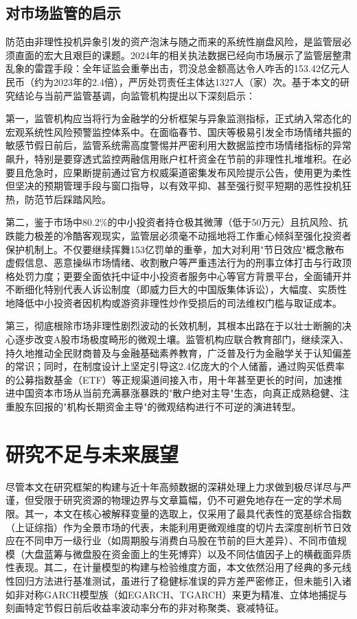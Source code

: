 \documentclass{cupb-thesis}
\begin{document}
{\section{对市场监管的启示}


防范由非理性投机异象引发的资产泡沫与随之而来的系统性崩盘风险，是监管层必须直面的宏大且艰巨的课题。2024年的相关执法数据已经向市场展示了监管层整肃乱象的雷霆手段：全年证监会重拳出击，罚没总金额高达令人咋舌的153.42亿元人民币（约为2023年的2.4倍），严厉处罚责任主体达1327人（家）次。基于本文的研究结论与当前严监管基调，向监管机构提出以下深刻启示：


第一，监管机构应当将行为金融学的分析框架与异象监测指标，正式纳入常态化的宏观系统性风险预警监控体系中。在面临春节、国庆等极易引发全市场情绪共振的敏感节假日前后，监管系统需高度警惕并严密利用大数据监控市场情绪指标的异常飙升，特别是要穿透式监控两融信用账户杠杆资金在节前的非理性扎堆堆积。在必要且危急时，应果断提前通过官方权威渠道密集发布风险提示公告，使用更为柔性但坚决的预期管理手段与窗口指导，以有效平抑、甚至强行熨平短期的恶性投机狂热，防范节后踩踏风险。

第二，鉴于市场中80.2\%的中小投资者持仓极其微薄（低于50万元）且抗风险、抗跌能力极差的冷酷客观现实，监管层必须毫不动摇地将工作重心倾斜至强化投资者保护机制上。不仅要继续挥舞153亿罚单的重拳，加大对利用"节日效应"概念散布虚假信息、恶意操纵市场情绪、收割散户等严重违法行为的刑事立体打击与行政顶格处罚力度；更要全面依托中证中小投资者服务中心等官方背景平台，全面铺开并不断细化特别代表人诉讼制度（即威力巨大的中国版集体诉讼），大幅度、实质性地降低中小投资者因机构或游资非理性炒作受损后的司法维权门槛与取证成本。

第三，彻底根除市场非理性剧烈波动的长效机制，其根本出路在于以壮士断腕的决心逐步改变A股市场极度畸形的微观土壤。监管机构应联合教育部门，继续深入、持久地推动全民财商普及与金融基础素养教育，广泛普及行为金融学关于认知偏差的常识；同时，在制度设计上坚定引导这2.4亿庞大的个人储蓄，通过购买低费率的公募指数基金（ETF）等正规渠道间接入市，用十年甚至更长的时间，加速推进中国资本市场从当前充满暴涨暴跌的"散户绝对主导"生态，向真正成熟稳健、注重股东回报的"机构长期资金主导"的微观结构进行不可逆的演进转型。


\chapter*{研究不足与未来展望}


尽管本文在研究框架的构建与近十年高频数据的深耕处理上力求做到极尽详尽与严谨，但受限于研究资源的物理边界与文章篇幅，仍不可避免地存在一定的学术局限。其一，本文在核心被解释变量的选取上，仅采用了最具代表性的宽基综合指数（上证综指）作为全景市场的代表，未能利用更微观维度的切片去深度剖析节日效应在不同申万一级行业（如周期股与消费白马股在节前的巨大差异）、不同市值规模（大盘蓝筹与微盘股在资金面上的生死博弈）以及不同估值因子上的横截面异质性表现。其二，在计量模型的构建与检验维度方面，本文依然沿用了经典的多元线性回归方法进行基准测试，虽进行了稳健标准误的异方差严密修正，但未能引入诸如非对称GARCH模型族（如EGARCH、TGARCH）来更为精准、立体地捕捉与刻画特定节假日前后收益率波动率分布的非对称聚类、衰减特征。


}
\end{document}
